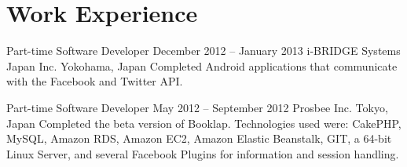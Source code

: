 \section*{Work Experience}



\employment
	{Part-time Software Developer}
	{December 2012 -- January 2013}
	{i-BRIDGE Systems Japan Inc.}
	{Yokohama, Japan}
	{Completed Android applications that communicate with the Facebook and Twitter API.}

\employment
	{Part-time Software Developer}
	{May 2012 -- September 2012}
	{Prosbee Inc.}
	{Tokyo, Japan}
	{Completed the beta version of Booklap. Technologies used were: CakePHP, MySQL, Amazon RDS, Amazon EC2, Amazon Elastic Beanstalk, GIT, a 64-bit Linux Server, and several Facebook Plugins for information and session handling.}

